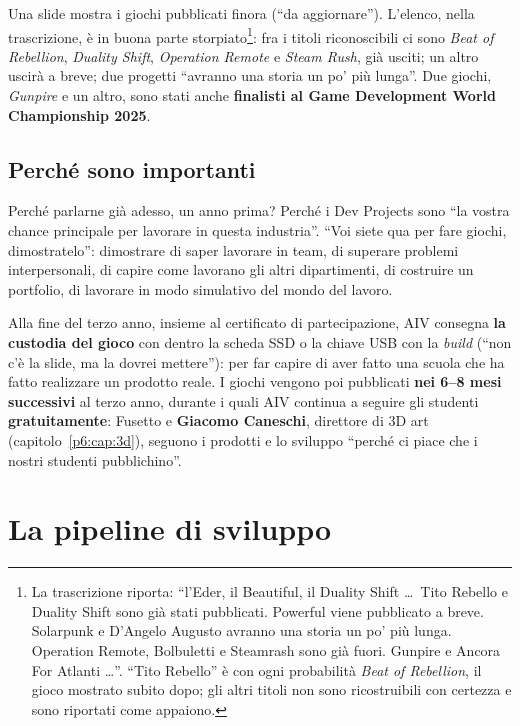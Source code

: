 Una slide mostra i giochi pubblicati finora (``da aggiornare'').
L'elenco, nella trascrizione, è in buona parte storpiato\footnote{La
trascrizione riporta: ``l'Eder, il Beautiful, il Duality Shift \ldots\ Tito
Rebello e Duality Shift sono già stati pubblicati. Powerful viene
pubblicato a breve. Solarpunk e D'Angelo Augusto avranno una storia un po'
più lunga. Operation Remote, Bolbuletti e Steamrash sono già fuori. Gunpire
e Ancora For Atlanti \ldots''. ``Tito Rebello'' è con ogni probabilità
\emph{Beat of Rebellion}, il gioco mostrato subito dopo; gli altri titoli
non sono ricostruibili con certezza e sono riportati come appaiono.}: fra i
titoli riconoscibili ci sono \emph{Beat of Rebellion}, \emph{Duality
Shift}, \emph{Operation Remote} e \emph{Steam Rush}, già usciti; un altro
uscirà a breve; due progetti ``avranno una storia un po' più lunga''. Due
giochi, \emph{Gunpire} e un altro, sono stati anche \textbf{finalisti al Game
Development World Championship 2025}.

\subsection{Perché sono importanti}

Perché parlarne già adesso, un anno prima? Perché i Dev Projects sono ``la
vostra chance principale per lavorare in questa industria''. ``Voi siete qua
per fare giochi, dimostratelo'': dimostrare di saper lavorare in team, di
superare problemi interpersonali, di capire come lavorano gli altri
dipartimenti, di costruire un portfolio, di lavorare in modo simulativo
del mondo del lavoro.

Alla fine del terzo anno, insieme al certificato di partecipazione, AIV
consegna \textbf{la custodia del gioco} con dentro la scheda SSD o la chiave
USB con la \emph{build} (``non c'è la slide, ma la dovrei mettere''): per far
capire di aver fatto una scuola che ha fatto realizzare un prodotto reale. I
giochi vengono poi pubblicati \textbf{nei 6--8 mesi successivi} al terzo
anno, durante i quali AIV continua a seguire gli studenti
\textbf{gratuitamente}: Fusetto e \textbf{Giacomo Caneschi}, direttore di 3D
art (capitolo~\ref{p6:cap:3d}), seguono i prodotti e lo sviluppo ``perché ci
piace che i nostri studenti pubblichino''.

\section{La pipeline di sviluppo}
\label{p1:sec:pipeline}

